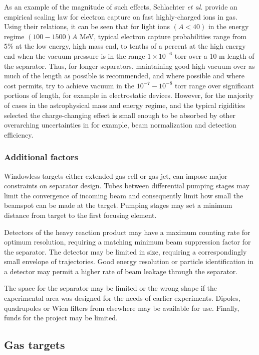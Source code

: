 As an example of the magnitude of such effects, Schlachter {\em et al.} \cite{sch83} provide an empirical scaling law for electron capture on fast highly-charged ions in gas. Using their relations, it can be seen that for light ions $(A<40)$ in the energy regime $(100-1500)A$ MeV, typical electron capture probabilities range from 5\% at the low energy, high mass end, to tenths of a percent at the high energy end when the vacuum pressure is in the range $1\times10^{-6}$ torr over a 10 m length of the separator. Thus, for longer separators, maintaining good high vacuum over as much of the length as possible is recommended, and where possible and where cost permits, try to achieve vacuum in the $10^{-7}-10^{-8}$ torr range over significant portions of length, for example in electrostatic devices. However, for the majority of cases in the astrophysical mass and energy regime, and the typical rigidities selected the charge-changing effect is small enough to be absorbed by other overarching uncertainties in for example, beam normalization and detection efficiency. 



\subsubsection{Additional factors} 
  Windowless targets either extended gas cell or gas jet, can impose major constraints on separator design.  Tubes between differential pumping stages may limit the convergence of incoming beam and consequently limit how small the beamspot  can be made at the target.  Pumping stages may set a minimum distance from target to the first focusing element.

Detectors of the heavy reaction product may have a maximum counting rate for optimum resolution, requiring a matching minimum beam suppression factor for the separator.   The detector may be limited in size, requiring a correspondingly small envelope of trajectories.    Good energy resolution or particle identification in a detector may permit a higher rate of beam leakage through the separator.

 The space   for the separator may be limited or the wrong shape if the experimental area was designed for the needs of earlier experiments.   Dipoles, quadrupoles  or Wien filters from elsewhere  may be available for use.  Finally,  funds for the project may be limited.   

\subsection{Gas targets}
\label{gas}


